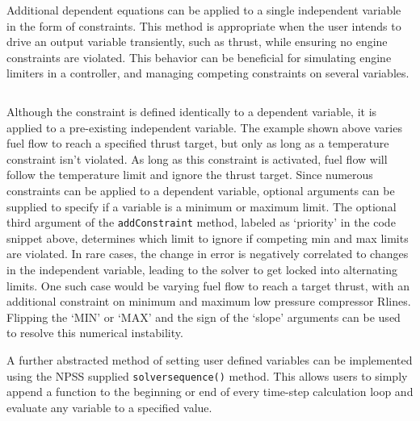 \documentclass[heading.tex]{subfiles}
\begin{document}
 \begin{adjustwidth}{1cm}{-1cm}
 \inputminted[]{c++}{code/solverSetup}
 \end{adjustwidth} 


Additional dependent equations can be applied to a single independent variable in the form of constraints.
This method is appropriate when the user intends to drive an output variable transiently,
such as thrust, while ensuring no engine constraints are violated.
This behavior can be beneficial for simulating engine limiters in a controller, and managing 
competing constraints on several variables.
 
 \begin{adjustwidth}{1cm}{-1cm}
 \inputminted[]{c++}{code/constraintSetup}
 \end{adjustwidth} 
 
Although the constraint is defined identically to a dependent variable, it is applied to a pre-existing independent variable.
The example shown above varies fuel flow to reach a specified thrust target, but only as long as a temperature constraint isn't violated.
As long as this constraint is activated, fuel flow will follow the temperature limit and ignore the thrust target.
Since numerous constraints can be applied to a dependent variable,
optional arguments can be supplied to specify if a variable is a minimum or maximum limit.
The optional third argument of the \texttt{addConstraint} method, labeled as `priority' in the code snippet above,
determines which limit to ignore if competing min and max limits are violated.
In rare cases, the change in error is negatively correlated to changes in the independent variable,
leading to the solver to get locked into alternating limits. One such case would be varying fuel flow to reach a target thrust,
with an additional constraint on minimum and maximum low pressure compressor Rlines.
Flipping the `MIN' or `MAX' and the sign of the `slope' arguments can be used to resolve this numerical instability.

A further abstracted method of setting user defined variables can be implemented using the NPSS supplied 
\texttt{solversequence()} method.
This allows users to simply append a function to the beginning or end of every time-step calculation loop
and evaluate any variable to a specified value. 
 
 \begin{adjustwidth}{-1cm}{-1cm}
 \inputminted[]{c++}{code/solverSequence}
 \end{adjustwidth} 
 
\end{document}
